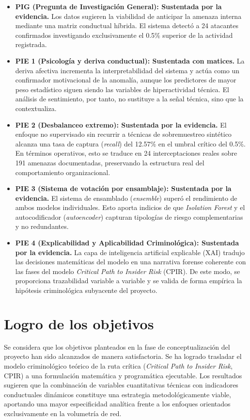 \documentclass[IB]{TFUOC}%
\begin{document}
\begin{itemize}
    \item \textbf{PIG (Pregunta de Investigación General): Sustentada por la evidencia.} Los datos sugieren la viabilidad de anticipar la amenaza interna mediante una matriz conductual híbrida. El sistema detectó a 24 atacantes confirmados investigando exclusivamente el 0.5\% superior de la actividad registrada.
    
    \item \textbf{PIE 1 (Psicología y deriva conductual): Sustentada con matices.} La deriva afectiva incrementa la interpretabilidad del sistema y actúa como un confirmador motivacional de la anomalía, aunque los predictores de mayor peso estadístico siguen siendo las variables de hiperactividad técnica. El análisis de sentimiento, por tanto, no sustituye a la señal técnica, sino que la contextualiza.
    
    \item \textbf{PIE 2 (Desbalanceo extremo): Sustentada por la evidencia.} El enfoque no supervisado sin recurrir a técnicas de sobremuestreo sintético alcanza una tasa de captura (\textit{recall}) del 12.57\% en el umbral crítico del 0.5\%. En términos operativos, esto se traduce en 24 interceptaciones reales sobre 191 amenazas documentadas, preservando la estructura real del comportamiento organizacional.
    
    \item \textbf{PIE 3 (Sistema de votación por ensamblaje): Sustentada por la evidencia.} El sistema de ensamblado (\textit{ensemble}) superó el rendimiento de ambos modelos individuales. Esto aporta indicios de que \textit{Isolation Forest} y el autocodificador (\textit{autoencoder}) capturan tipologías de riesgo complementarias y no redundantes.
    
    \item \textbf{PIE 4 (Explicabilidad y Aplicabilidad Criminológica): Sustentada por la evidencia.} La capa de inteligencia artificial explicable (XAI) tradujo las decisiones matemáticas del modelo en una narrativa forense coherente con las fases del modelo \textit{Critical Path to Insider Risk} (CPIR). De este modo, se proporciona trazabilidad variable a variable y se valida de forma empírica la hipótesis criminológica subyacente del proyecto.
\end{itemize}

\section{Logro de los objetivos}
Se considera que los objetivos planteados en la fase de conceptualización del proyecto han sido alcanzados de manera satisfactoria. Se ha logrado trasladar el modelo criminológico teórico de la ruta crítica (\textit{Critical Path to Insider Risk}, CPIR) a una formulación matemática y programática ejecutable. Los resultados sugieren que la combinación de variables cuantitativas técnicas con indicadores conductuales dinámicos constituye una estrategia metodológicamente viable, aportando una mayor especificidad analítica frente a los enfoques orientados exclusivamente en la volumetría de red.
\end{document}
